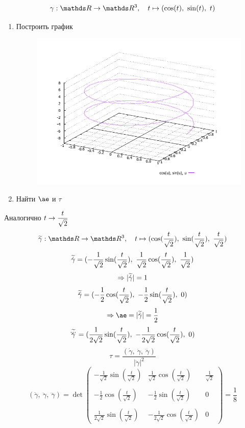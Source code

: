 \documentclass[main]{subfiles}
\begin{document}
    \begin{Example}
      \[\gamma: \R \ra \R^3,\q t \mapsto (\cos(t),\ \sin(t),\ t)\]
      \begin{enumerate}
        \item Построить график
        \begin{figure}[H]
            \includegraphics[scale=0.6]{pics/2_3.png}
            \centering
        \end{figure}
        \item Найти $\ae$ и $\tau$
      \end{enumerate}
    \end{Example}

    \begin{sol}
        Аналогично $t \rightarrow \dfrac{t}{\sqrt{2}}$
        \[\w{\gamma}: \R \ra \R^3,\q t \mapsto (\cos(\frac{t}{\sqrt{2}}),\ \sin(\frac{t}{\sqrt{2}}),\ \frac{t}{\sqrt{2}})\]
        \[\w{\dot{\gamma}}=(-\frac{1}{\sqrt{2}} \sin(\frac{t}{\sqrt{2}}),\ \frac{1}{\sqrt{2}} \cos(\frac{t}{\sqrt{2}}),\ \frac{1}{\sqrt{2}})\]
        \[\Rightarrow |\widetilde{\dot{\gamma}}|=1\]
        \[\w{\ddot{\gamma}}=(-\frac{1}{2} \cos(\frac{t}{\sqrt{2}}),\ -\frac{1}{2} \sin(\frac{t}{\sqrt{2}}),\ 0)\]
        \[\Ra \ae = |\w{\ddot{\gamma}}| = \frac{1}{2}\]
        \[\widetilde{\overset{{}_{\displaystyle ...}}{\gamma}}=(\frac{1}{2 \sqrt{2}} \sin(\frac{t}{\sqrt{2}}),\ -\frac{1}{2 \sqrt{2}} \cos(\frac{t}{\sqrt{2}}),\ 0)\]
        \[\tau = \frac{(\dot{\gamma},\ \ddot{\gamma},\ \dddot{\gamma})}{|\ddot{\gamma}|^2}\]
        \[(\dot{\gamma},\ \ddot{\gamma},\ \dddot{\gamma}) = \det
        \begin{pmatrix}
          -\frac{1}{\sqrt{2}} \sin(\frac{t}{\sqrt{2}}) & \frac{1}{\sqrt{2}} \cos(\frac{t}{\sqrt{2}}) & \frac{1}{\sqrt{2}}\\ \\
          -\frac{1}{2} \cos(\frac{t}{\sqrt{2}}) & -\frac{1}{2} \sin(\frac{t}{\sqrt{2}}) & 0\\ \\
          \frac{1}{2 \sqrt{2}} \sin(\frac{t}{\sqrt{2}}) & -\frac{1}{2 \sqrt{2}} \cos(\frac{t}{\sqrt{2}}) & 0
        \end{pmatrix} = \frac{1}{8}\]
    \end{sol}
\end{document}
